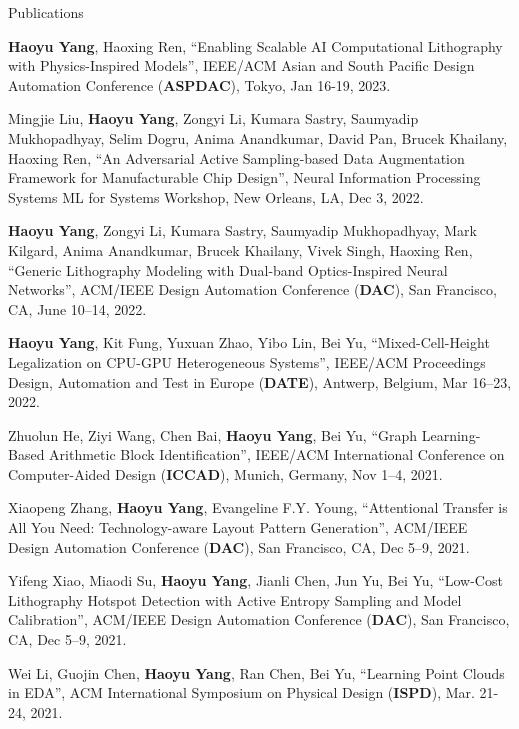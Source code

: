 \begin{rSection}{Publications}
\begin{description}[font=\normalfont]
	\item[{[C26]}] \textbf{Haoyu Yang}, Haoxing Ren, ``Enabling Scalable AI Computational Lithography with Physics-Inspired Models'', IEEE/ACM Asian and South Pacific Design Automation Conference (\textbf{ASPDAC}), Tokyo, Jan 16-19, 2023.
	
	\item[{[C25]}] Mingjie Liu, \textbf{Haoyu Yang}, Zongyi Li, Kumara Sastry, Saumyadip Mukhopadhyay, Selim Dogru, Anima Anandkumar, David Pan, Brucek Khailany, Haoxing Ren,
	``An Adversarial Active Sampling-based Data Augmentation Framework for Manufacturable Chip Design'',
	Neural Information Processing Systems ML for Systems Workshop, New Orleans, LA, Dec 3, 2022.
	
	\item[{[C24]}] \textbf{Haoyu Yang}, Zongyi Li, Kumara Sastry, Saumyadip Mukhopadhyay, Mark Kilgard, Anima Anandkumar, Brucek Khailany, Vivek Singh, Haoxing Ren,
	``Generic Lithography Modeling with Dual-band Optics-Inspired Neural Networks'',
	ACM/IEEE Design Automation Conference (\textbf{DAC}), San Francisco, CA, June 10–14, 2022.
	
	\item[{[C23]}] \textbf{Haoyu Yang}, Kit Fung, Yuxuan Zhao, Yibo Lin, Bei Yu,
	``Mixed-Cell-Height Legalization on CPU-GPU Heterogeneous Systems'',
	IEEE/ACM Proceedings Design, Automation and Test in Europe (\textbf{DATE}), Antwerp, Belgium, Mar 16–23, 2022.
	
	\item[{[C22]}] Zhuolun He, Ziyi Wang, Chen Bai, \textbf{Haoyu Yang}, Bei Yu, ``Graph Learning-Based Arithmetic Block Identification'',
	IEEE/ACM International Conference on Computer-Aided Design (\textbf{ICCAD}), Munich, Germany, Nov 1–4, 2021.
	
	\item[{[C21]}] Xiaopeng Zhang, \textbf{Haoyu Yang}, Evangeline F.Y. Young, ``Attentional Transfer is All You Need: Technology-aware Layout Pattern Generation'',
	ACM/IEEE Design Automation Conference (\textbf{DAC}), San Francisco, CA, Dec 5–9, 2021.
	
	
	\item[{[C20]}] Yifeng Xiao, Miaodi Su, \textbf{Haoyu Yang}, Jianli Chen, Jun Yu, Bei Yu,
	``Low-Cost Lithography Hotspot Detection with Active Entropy Sampling and Model Calibration'',
	ACM/IEEE Design Automation Conference (\textbf{DAC}), San Francisco, CA, Dec 5–9, 2021.
	
	\item[{[C19]}] Wei Li, Guojin Chen, \textbf{Haoyu Yang}, Ran Chen, Bei Yu,
	``Learning Point Clouds in EDA'', ACM International Symposium on Physical Design (\textbf{ISPD}), Mar. 21-24, 2021.


\end{description}
\end{rSection}
